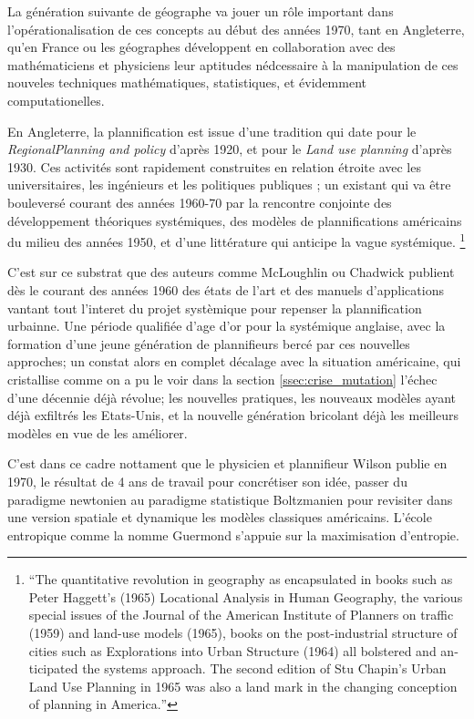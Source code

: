 La génération suivante de géographe va jouer un rôle important dans l'opérationalisation de ces concepts au début des années 1970, tant en Angleterre, qu'en France ou les géographes développent en collaboration avec des mathématiciens et physiciens leur aptitudes nédcessaire à la manipulation de ces nouveles techniques mathématiques, statistiques, et évidemment computationelles. \autocite{Pumain2002} 

En Angleterre, la plannification est issue d'une tradition qui date pour le \textit{RegionalPlanning and policy} d'après 1920, et pour le \textit{Land use planning} d'après 1930. Ces activités sont rapidement construites en relation étroite avec les universitaires, les ingénieurs et les politiques publiques \autocite{Bennett2003}; un existant qui va être bouleversé courant des années 1960-70 par la rencontre conjointe des développement théoriques systémiques, des modèles de plannifications américains du milieu des années 1950, et d'une littérature qui anticipe la vague systémique. \footnote{\foreignquote{english}{The quantitative revolution in geography as encapsulated in books such as Peter Haggett's (1965) Locational Analysis in Human Geography, the various special issues of the Journal of the American Institute of Planners on traffic (1959) and land-use models (1965), books on the post-industrial structure of cities such as Explorations into Urban Structure (1964) all bolstered and anticipated the systems approach. The second edition of Stu Chapin's Urban Land Use Planning in 1965 was also a land mark in the changing conception of planning in America.}\autocite[253]{Batty1978}}

C'est sur ce substrat \autocite[253]{Batty1978} que des auteurs comme McLoughlin ou Chadwick publient dès le courant des années 1960 des états de l'art et des manuels d'applications vantant tout l'interet du projet systèmique pour repenser la plannification urbainne. Une période qualifiée d'age d'or pour la systémique anglaise, avec la formation d'une jeune génération de plannifieurs bercé par ces nouvelles approches; un constat alors en complet décalage avec la situation américaine, qui cristallise comme on a pu le voir dans la section \ref{ssec:crise_mutation} l'échec d'une décennie déjà révolue; les nouvelles pratiques, les nouveaux modèles ayant déjà exfiltrés les Etats-Unis, et la nouvelle génération bricolant déjà les meilleurs modèles en vue de les améliorer.

C'est dans ce cadre nottament que le physicien et plannifieur Wilson publie en 1970, le résultat de 4 ans de travail pour concrétiser son idée, passer du paradigme newtonien au paradigme statistique Boltzmanien pour revisiter dans une version spatiale et dynamique les modèles classiques américains. \autocite{Wilson2010}  L'école entropique comme la nomme Guermond s'appuie sur la maximisation d'entropie.

